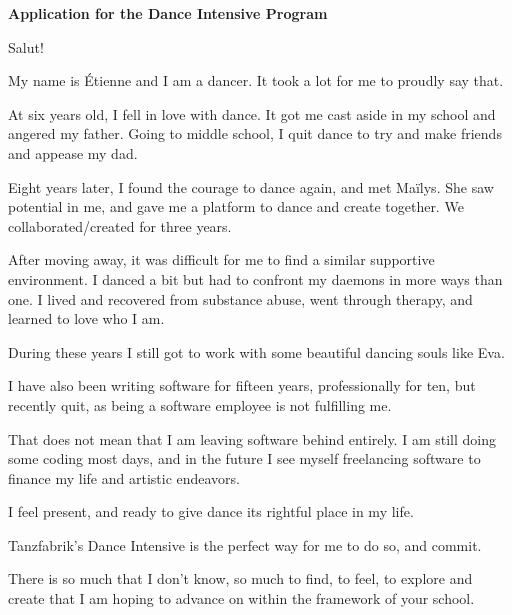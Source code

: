 \documentclass[12pt, a4paper]{article}
\begin{document}
\textbf{Application for the Dance Intensive Program}

\bigskip

Salut!

My name is Étienne and I am a dancer. It took a lot for me to proudly say that.

At six years old, I fell in love with dance. It got me cast aside in my school and angered my father.
Going to middle school, I quit dance to try and make friends and appease my dad.

Eight years later, I found the courage to dance again, and met Maïlys.
She saw potential in me, and gave me a platform to dance and create together.
We collaborated/created for three years.

After moving away, it was difficult for me to find a similar supportive environment.
I danced a bit but had to confront my daemons in more ways than one.
I lived and recovered from substance abuse, went through therapy, and learned to love who I am.

During these years I still got to work with some beautiful dancing souls like Eva.

I have also been writing software for fifteen years, professionally for ten,
but recently quit, as being a software employee is not fulfilling me.

That does not mean that I am leaving software behind entirely.
I am still doing some coding most days,
and in the future I see myself freelancing software to finance my life and artistic endeavors.

I feel present, and ready to give dance its rightful place in my life.

Tanzfabrik's Dance Intensive is the perfect way for me to do so, and commit.

There is so much that I don't know, so much to find, to feel, to explore and
create that I am hoping to advance on within the framework of your school.




\end{document}
